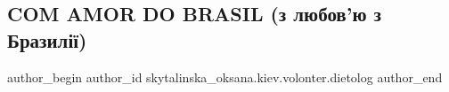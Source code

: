  
 
 
 
 
 
\subsection{COM AMOR DO BRASIL (з любов'ю з Бразилії)}
\label{sec:16_11_2022.fb.skytalinska_oksana.kiev.volonter.dietolog.1.com_amor_do_brasil}
 
\ifcmt
 author_begin
   author_id skytalinska_oksana.kiev.volonter.dietolog
 author_end
\fi


